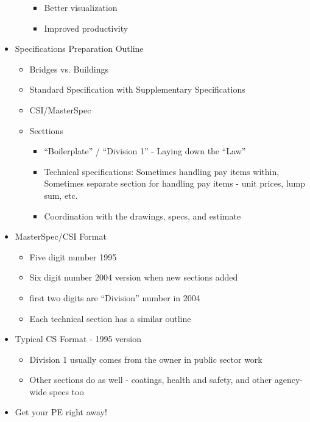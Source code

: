 \documentclass{article}
\begin{document}
\begin{itemize}
\begin{itemize}
\begin{itemize}
            \item Better visualization
            \item Improved productivity
        \end{itemize}
    \end{itemize}
        \item Specifications Preparation Outline
        \begin{itemize}
            \item Bridges vs. Buildings
            \item Standard Specification with Supplementary Specifications
            \item CSI/MasterSpec
            \item Secttions
            \begin{itemize}
                \item ``Boilerplate'' / ``Division 1'' - Laying down the ``Law''
                \item Technical specifications: Sometimes handling pay items within, Sometimes separate section for handling pay items - unit prices, lump sum, etc.
                \item Coordination with the drawings, specs, and estimate
            \end{itemize}
        \end{itemize}
        \item MasterSpec/CSI Format
        \begin{itemize}
            \item Five digit number 1995
            \item Six digit number 2004 version when new sections added
            \item first two digits are ``Division'' number in 2004
            \item Each technical section has a similar outline
        \end{itemize}
        \item Typical CS Format - 1995 version
        \begin{itemize}
            \item Division 1 usually comes from the owner in public sector work
            \item Other sections do as well - coatings, health and safety, and other agency-wide specs too
        \end{itemize}
        \item Get your PE right away!
\end{itemize}
\end{document}

